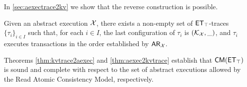 
In \cref{sec:aexectrace2kv} we show that the reverse construction is possible.
\begin{theorem}
\label{thm:aexec2kvtrace}
Given an abstract execution $\mathcal{X}$, there exists a non-empty 
set of $\mathsf{ET}_{\top}$-traces $\{\tau_{i}\}_{i \in I}$ such that, for each $i \in I$, the last configuration of $\tau_{i}$ is 
$(\mathcal{K}_{\mathcal{X}}, \_)$, and $\tau_{i}$ executes transactions in the order established by $\mathsf{AR}_{\mathcal{X}}$. 
\end{theorem}
\noindent Theorems \ref{thm:kvtrace2aexec} and \ref{thm:aexec2kvtrace} establish that $\CMs(\ET_{\top})$ is 
sound and complete with respect to the set of abstract executions allowed by the Read Atomic Consistency Model, 
respectively. 

